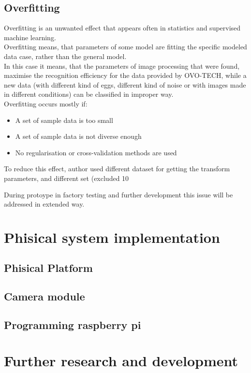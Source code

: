 \documentclass[12pt,twoside,a4paper]{article}
\begin{document}
\subsection{Overfitting}
Overfitting is an unwanted effect that appears often in statistics and supervised machine learning.\\
Overfitting means, that parameters of some model are fitting the specific modeled data case, rather than the general model.\\

In this case it means, that the parameters of image processing that were found, maximise the recognition efficiency for the data provided by OVO-TECH, while a new data (with different kind of eggs, different kind of noise or with images made in different conditions) can be classified in improper way.\\

Overfitting occurs mostly if:
\begin{itemize}
\item A set of sample data is too small
\item A set of sample data is not diverse enough
\item No regularisation or cross-validation methods are used
\end{itemize}

To reduce this effect, author used different dataset for getting the transform parameters, and different set (excluded 10%

During protoype in factory testing and further development this issue will be addressed in extended way.

\section{Phisical system implementation}
\subsection{Phisical Platform}
\subsection{Camera module}
\subsection{Programming raspberry pi}

\section{Further research and development}
\end{document}
